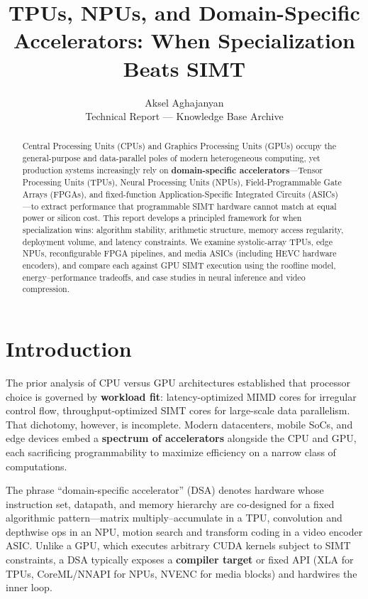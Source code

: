 \documentclass[11pt,journal,onecolumn]{IEEEtran}
\begin{document}
\title{TPUs, NPUs, and Domain-Specific Accelerators: When Specialization Beats SIMT}

\author{Aksel Aghajanyan \\ \small Technical Report --- Knowledge Base Archive}

\maketitle

\begin{abstract}
Central Processing Units (CPUs) and Graphics Processing Units (GPUs) occupy the general-purpose and data-parallel poles of modern heterogeneous computing, yet production systems increasingly rely on \textbf{domain-specific accelerators}---Tensor Processing Units (TPUs), Neural Processing Units (NPUs), Field-Programmable Gate Arrays (FPGAs), and fixed-function Application-Specific Integrated Circuits (ASICs)---to extract performance that programmable SIMT hardware cannot match at equal power or silicon cost. This report develops a principled framework for when specialization wins: algorithm stability, arithmetic structure, memory access regularity, deployment volume, and latency constraints. We examine systolic-array TPUs, edge NPUs, reconfigurable FPGA pipelines, and media ASICs (including HEVC hardware encoders), and compare each against GPU SIMT execution using the roofline model, energy--performance tradeoffs, and case studies in neural inference and video compression.
\end{abstract}

\section{Introduction}
The prior analysis of CPU versus GPU architectures established that processor choice is governed by \textbf{workload fit}: latency-optimized MIMD cores for irregular control flow, throughput-optimized SIMT cores for large-scale data parallelism. That dichotomy, however, is incomplete. Modern datacenters, mobile SoCs, and edge devices embed a \textbf{spectrum of accelerators} alongside the CPU and GPU, each sacrificing programmability to maximize efficiency on a narrow class of computations.

The phrase ``domain-specific accelerator'' (DSA) denotes hardware whose instruction set, datapath, and memory hierarchy are co-designed for a fixed algorithmic pattern---matrix multiply--accumulate in a TPU, convolution and depthwise ops in an NPU, motion search and transform coding in a video encoder ASIC. Unlike a GPU, which executes arbitrary CUDA kernels subject to SIMT constraints, a DSA typically exposes a \textbf{compiler target} or fixed API (XLA for TPUs, CoreML/NNAPI for NPUs, NVENC for media blocks) and hardwires the inner loop.
\end{document}
